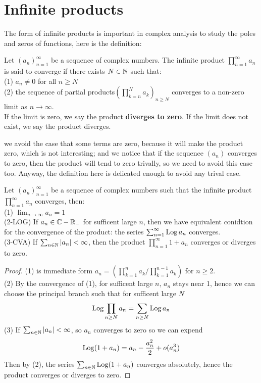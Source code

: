 \documentclass[12pt,a4paper]{article}
\begin{document}
\newpage
\section{Infinite products}
The form of infinite products is important in complex analysis to study the poles and zeros of functions, here is the definition:

\begin{definition}
    Let \((a_n)_{n=1}^{\infty}\) be a sequence of complex numbers. The infinite product \(\prod_{n=1}^{\infty} a_n\) is said to converge if there exists \(N \in \mathbb{N}\) such that:\\
    (1) \(a_n \neq 0\) for all \(n \geq N\)\\
    (2) the sequence of partial products\((\prod_{k=n}^N a_k)_{n \geq N}\) converges to a non-zero limit as \(n \to \infty\).\\
If the limit is zero, we say the product \textbf{diverges to zero}. If the limit does not exist, we say the product diverges.
\end{definition}
we avoid the case that some terms are zero, because it will make the product zero, which is not interesting; and we notice that if the sequence \((a_n)\) converges to zero, then the product will tend to zero trivally, so we need to avoid this case too. Anyway, the definition here is delicated enough to avoid any trival case.

\begin{proposition}
    Let \((a_n)_{n=1}^{\infty}\) be a sequence of complex numbers such that the infinite product \(\prod_{n=1}^{\infty} a_n\) converges, then:\\
    (1) \(\lim_{n \to \infty} a_n = 1\)\\
    (2-LOG) If \(a_n \in \mathbb{C}-\mathbb{R}_{-}\) for sufficent large \(n\), then we have equivalent conidtion for the convergence of the product: the series \(\sum_{n=1}^{\infty} \operatorname{Log} a_n\) converges.\\
    (3-CVA) If \(\sum_{n \in \mathbb{N}} |a_n| < \infty\), then the product \(\prod_{n=1}^{\infty} 1+a_n\) converges or diverges to zero.

    \begin{proof}
        (1) is immediate form \(a_n = (\prod_{k=1}^{n}a_k/\prod_{k=1}^{n-1}a_k)\) for \(n \geq 2\).\\
        (2) By the convergence of (1), for sufficent large \(n\), \(a_n\) stays near 1, hence we can choose the principal branch such that for sufficent large \(N\)
        \[\operatorname{Log} \prod_{n \geq N}a_n = \sum_{n \geq N} \operatorname{Log} a_n\]
        (3) If \(\sum_{n \in \mathbb{N}} |a_n| < \infty\), so \(a_n\) converges to zero so we can expend 
        \begin{align*}
            \operatorname{Log}(1+a_n) = a_n-\frac{a_n^2}{2} + o(a_n^3)
        \end{align*}
        Then by (2), the series \(\sum_{n \in \mathbb{N}} \operatorname{Log}(1+a_n)\) converges absolutely, hence the product converges or diverges to zero.
        
    \end{proof}
\end{proposition}
\end{document}
